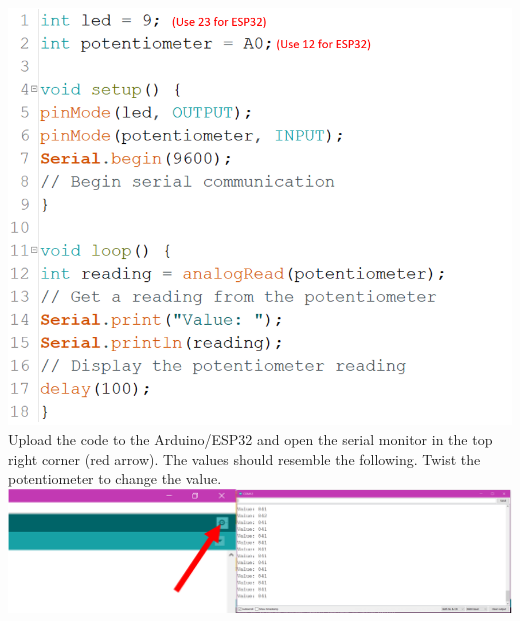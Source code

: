 \documentclass[a4paper,12pt]{report}
\newcommand{\diagramWidth}{150mm}
\begin{document}
\newpage
    \includegraphics[width = \diagramWidth]{Assets/serial_code.png} \\
    Upload the code to the Arduino/ESP32 and open the serial monitor in the top right corner (red arrow). The values should resemble the following. Twist the potentiometer to change the value. \\
    \includegraphics[width = \diagramWidth]{Assets/serial_monitor.png}

\newpage
\end{document}
